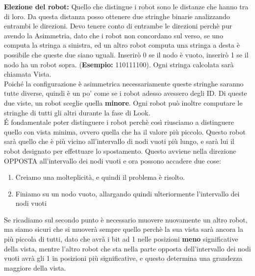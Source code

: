 \textbf{Elezione del robot:} Quello che distingue i robot sono le distanze che
hanno tra di loro. Da questa distanza posso ottenere due stringhe binarie
analizzando entrambi le direzioni. Devo tenere conto di entrambe le direzioni
perchè pur avendo la Asimmetria, dato che i robot non concordano sul verso, se
uno computa la stringa a sinistra, ed un altro robot computa una stringa a desta
è possibile che queste due siano uguali. Inserirò 0 se il nodo è vuoto, inserirò
1 se il nodo ha un robot sopra. (\textbf{Esempio:} 110111100). Ogni stringa
calcolata sarà chiamata Vista. \\ Poiché la configurazione è asimmetrica
necessariamente queste stringhe saranno tutte diverse, quindi è un po' come se i
robot adesso avessero degli ID. Di queste due viste, un robot sceglie quella
\textbf{minore}. Ogni robot può inoltre computare le stringhe di tutti gli altri
durante la fase di Look.\\ \'E fondamentale poter distinguere i robot perchè
così riusciamo a distinguere quello con vista minima, ovvero quella che ha il
valore più piccolo. Questo robot sarà quello che è più vicino all'intervallo di
nodi vuoti più lungo, e sarà lui il robot designato per effettuare lo
spostamento. Questo avviene nella direzione OPPOSTA all'intervallo dei nodi
vuoti e ora possono accadere due cose:
\begin{enumerate}
    \item Creiamo una molteplicità, e quindi il problema è risolto.
    \item Finiamo su un nodo vuoto, allargando quindi ulteriormente l'intervallo
          dei nodi vuoti
\end{enumerate}
Se ricadiamo sul secondo punto è necessario muovere nuovamente un altro robot,
ma siamo sicuri che si muoverà sempre quello perchè la sua vista sarà ancora la
più piccola di tutti, dato che avrà i bit ad 1 nelle posizioni \textbf{meno}
significative della vista, mentre l'altro robot che sta nella parte opposta
dell'intervallo dei nodi vuoti avrà gli 1 in posizioni più significative, e
questo determina una grandezza maggiore della vista.




